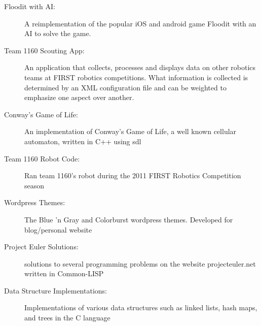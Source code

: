 \documentclass[letterpaper,11pt]{article}
\begin{document}
\begin{description}
\item[Floodit with AI:]
  { \footnotesize A reimplementation of the popular
    iOS and android game Floodit with an AI to solve the game.}
\item[Team 1160 Scouting App:]
  { \footnotesize An application that collects, processes
    and displays data on other robotics teams at
    FIRST robotics competitions. What information is
    collected is determined by an XML configuration
    file and can be weighted to emphasize one aspect
    over another.
  }
  \vspace{-1mm}
  
  \item[Conway's Game of Life:]
  { \footnotesize An implementation of Conway's Game of
    Life, a well known cellular automaton, written in
    C++ using sdl
  }
\item[Team 1160 Robot Code:]
  { \footnotesize Ran team 1160's robot
    during the 2011 FIRST Robotics Competition
    season
  }
\item[Wordpress Themes:]
  { \footnotesize The Blue 'n Gray and Colorburst
    wordpress themes. Developed for blog/personal website
  }
\item[Project Euler Solutions:]
  { \footnotesize solutions to several programming problems on the
    website projecteuler.net written in Common-LISP
  }
\item[Data Structure Implementations:]
  { \footnotesize Implementations of various data structures
    such as linked lists, hash maps, and trees in the
    C language
  }

\end{description} %
\end{document}
